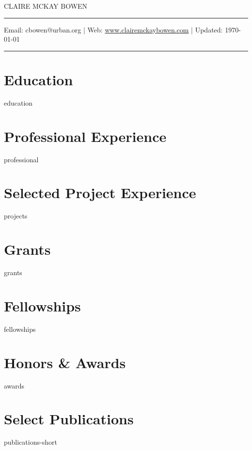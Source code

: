 \documentclass[11pt, letterpaper, roman]{moderncv} %
\begin{document}
\vspace{-10pt}
\centerline{\huge{CLAIRE MCKAY BOWEN}}
\vspace{10pt}
\hrule
\vspace{5pt}
\centerline{\small Email: cbowen@urban.org | Web: \href{https://www.clairemckaybowen.com}{www.clairemckaybowen.com} | Updated: \today}
\vspace{5pt}
\hrule

\section{Education}
{education}


\vspace{-10pt}
\section{Professional Experience}
{professional}

\vspace{-10pt}
\section{Selected Project Experience}
{projects}
    
\vspace{-10pt}
\section{Grants}
{grants}

\section{Fellowships}
{fellowships}

\vspace{-10pt}
\section{Honors \& Awards}
{awards}
    
\section{Select Publications}
{publications-short}
\end{document}
